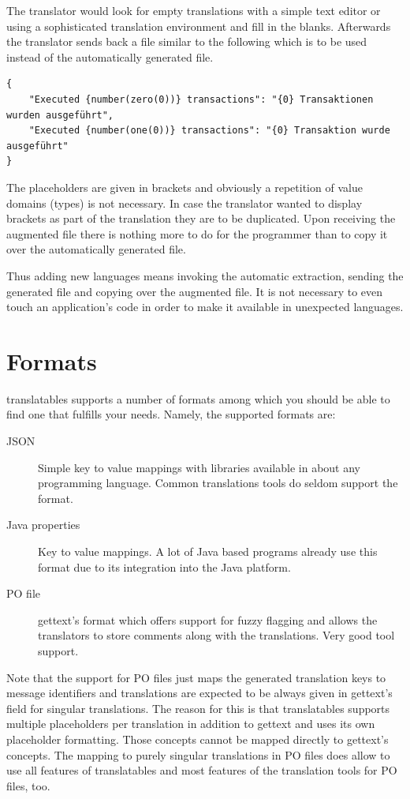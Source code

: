\documentclass[a4paper,11pt,twoside]{report}
\begin{document}
The translator would look for empty translations with a simple text editor or using a sophisticated translation environment and fill in the blanks. Afterwards the translator sends back a file similar to the following which is to be used instead of the automatically generated file.
\begin{lstlisting}
{
	"Executed {number(zero(0))} transactions": "{0} Transaktionen wurden ausgeführt",
	"Executed {number(one(0))} transactions": "{0} Transaktion wurde ausgeführt"
}
\end{lstlisting}
The placeholders are given in brackets and obviously a repetition of value domains (types) is not necessary. In case the translator wanted to display brackets as part of the translation they are to be duplicated. Upon receiving the augmented file there is nothing more to do for the programmer than to copy it over the automatically generated file.

Thus adding new languages means invoking the automatic extraction, sending the generated file and copying over the augmented file. It is not necessary to even touch an application's code in order to make it available in unexpected languages.

\section{Formats}\label{formats}
translatables supports a number of formats among which you should be able to find one that fulfills your needs. Namely, the supported formats are:
\begin{description}
	\item[\ac{JSON}] Simple key to value mappings with libraries available in about any programming language. Common translations tools do seldom support the format.
	\item[Java properties] Key to value mappings. A lot of Java based programs already use this format due to its integration into the Java platform.
	\item[\ac{PO} file] gettext's format which offers support for fuzzy flagging and allows the translators to store comments along with the translations. Very good tool support.
\end{description}

Note that the support for \ac{PO} files just maps the generated translation keys to message identifiers and translations are expected to be always given in gettext's field for singular translations. The reason for this is that translatables supports multiple placeholders per translation in addition to gettext and uses its own placeholder formatting. Those concepts cannot be mapped directly to gettext's concepts. The mapping to purely singular translations in \ac{PO} files does allow to use all features of translatables and most features of the translation tools for \ac{PO} files, too.
\end{document}

